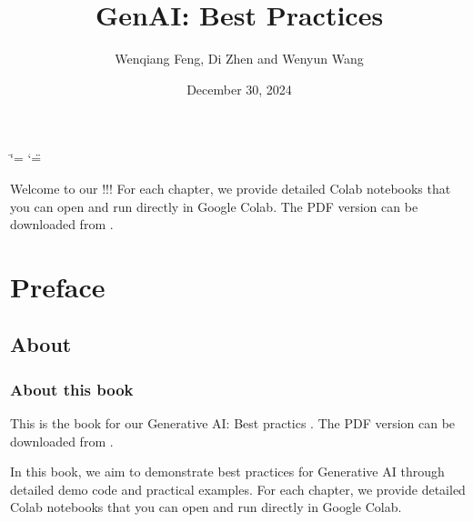 \documentclass[letterpaper,11pt,english]{sphinxmanual}
\title{GenAI: Best Practices}
\date{December 30, 2024}
\author{Wenqiang Feng, Di Zhen and Wenyun Wang}
\begin{document}
\ifdefined\shorthandoff
  \ifnum\catcode`\=\string=\active\shorthandoff{=}\fi
  \ifnum\catcode`\"=\active{}\fi
\fi

\pagestyle{empty}
\sphinxmaketitle
\pagestyle{plain}
\sphinxtableofcontents
\pagestyle{normal}
\label{\detokenize{index::doc}}\label{\detokenize{index:index}}\begin{quote}

\begin{figure}[htbp]
\centering

\noindent{}
\end{figure}
\end{quote}

\sphinxAtStartPar
Welcome to our !!! For each chapter, we provide detailed
Colab notebooks  that you can open and run directly in Google Colab.
The PDF version can be downloaded from .



\sphinxstepscope


\chapter{Preface}
\label{\detokenize{preface:id1}}\label{\detokenize{preface::doc}}

\section{About}
\label{\detokenize{preface:about}}

\subsection{About this book}
\label{\detokenize{preface:about-this-book}}
\sphinxAtStartPar
This is the book for our Generative AI: Best practics .
The PDF version can be downloaded from .

\sphinxAtStartPar
In this book, we aim to demonstrate best practices for Generative AI
through detailed demo code and practical examples. For each chapter, we provide detailed
Colab notebooks  that you can open and run directly in Google Colab.
\end{document}
